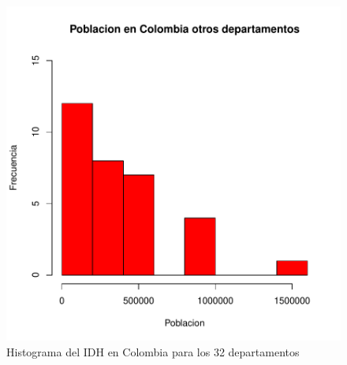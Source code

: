 \begin{figure}[h]
\centering
\includegraphics{univariada-summaryDatos}
\caption{Histograma del IDH en Colombia para los 32 departamentos}
\label{barplot1}
\end{figure}

